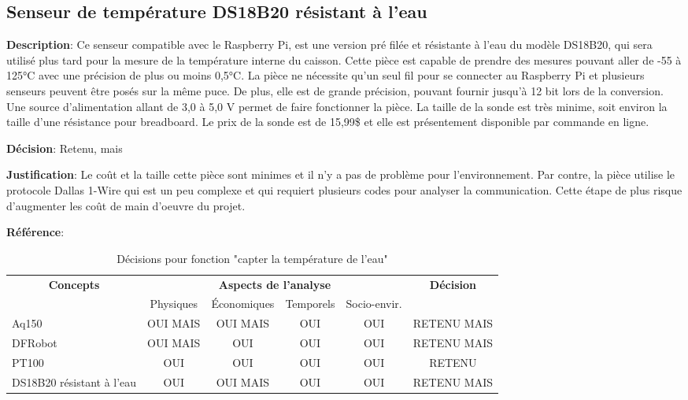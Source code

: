 \subsection{Senseur de température DS18B20 résistant à l’eau}


\textbf{Description}: Ce senseur compatible avec le Raspberry Pi, est une version pré filée et résistante à l’eau du modèle DS18B20, qui sera utilisé plus tard pour la mesure de la température interne du caisson. Cette pièce est capable de prendre des mesures pouvant aller de -55 à 125°C avec une précision de plus ou moins 0,5°C. La pièce ne nécessite qu’un seul fil pour se connecter au Raspberry Pi et plusieurs senseurs peuvent être posés sur la même puce. De plus, elle est de grande précision, pouvant fournir jusqu’à 12 bit lors de la conversion. Une source d’alimentation allant de 3,0 à 5,0 V permet de faire fonctionner la pièce. La taille de la sonde est très minime, soit environ la taille d’une résistance pour breadboard. Le prix de la sonde est de 15,99\$ et elle est présentement disponible par commande en ligne. 

\textbf{Décision}: Retenu, mais

\textbf{Justification}: Le coût et la taille cette pièce sont minimes et il n’y a pas de problème pour l’environnement. Par contre, la pièce utilise le protocole Dallas 1-Wire qui est un peu complexe et qui requiert plusieurs codes pour analyser la communication. Cette étape de plus risque d’augmenter les coût de main d'oeuvre du projet.

\textbf{Référence}: \cite{adafruitDS18B20}



\begin{table}[!htbp]
	\begin{tabular}{|l|c|c|c|c|c|}
		\hline
		\multicolumn{1}{|c|}{\multirow{2}{*}{\textbf{Concepts}}} & \multicolumn{4}{c|}{\textbf{Aspects de l'analyse}} & \multirow{2}{*}{\textbf{Décision}} \\ \cline{2-5}
		\multicolumn{1}{|c|}{}                                   & Physiques & Économiques & Temporels & Socio-envir. &                                    \\ \hline
		Aq150                                                  & OUI MAIS      & OUI MAIS        & OUI       & OUI          & RETENU MAIS                            \\ \hline
		DFRobot                                                 & OUI MAIS      & OUI         & OUI       & OUI          & RETENU MAIS                            \\ \hline
		PT100                                                 & OUI       & OUI         & OUI       & OUI          & RETENU                             \\ \hline
		DS18B20 résistant à l’eau                                                 & OUI       & OUI MAIS        & OUI       & OUI          & RETENU	MAIS       \\ \hline
	\end{tabular}
	\caption{Décisions pour fonction "capter la température de l'eau"}
	\label{tab:fct_tempeau}
\end{table}
